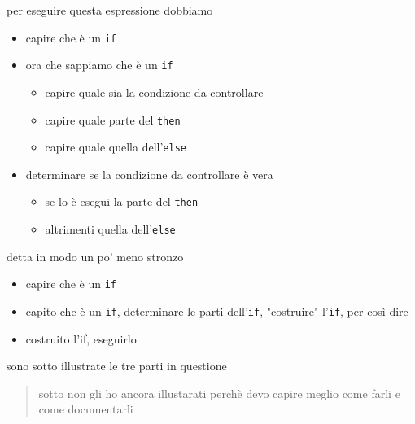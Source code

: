 \documentclass[11pt]{article}
\begin{document}
per eseguire questa espressione dobbiamo
\begin{itemize}
\item capire che è un \texttt{if}
\item ora che sappiamo che è un \texttt{if}
\begin{itemize}
\item capire quale sia la condizione da controllare
\item capire quale parte del \texttt{then}
\item capire quale quella dell'\texttt{else}
\end{itemize}
\item determinare se la condizione da controllare è vera
\begin{itemize}
\item se lo è esegui la parte del \texttt{then}
\item altrimenti quella dell'\texttt{else}
\end{itemize}
\end{itemize}

detta in modo un po' meno stronzo
\begin{itemize}
\item capire che è un \texttt{if}
\item capito che è un \texttt{if}, determinare le parti dell'\texttt{if}, "costruire" l'\texttt{if}, per così dire
\item costruito l'if, eseguirlo
\end{itemize}

sono sotto illustrate le tre parti in questione

\begin{quote}
sotto non gli ho ancora illustarati perchè devo capire meglio come farli e come documentarli
\end{quote}
\end{document}

